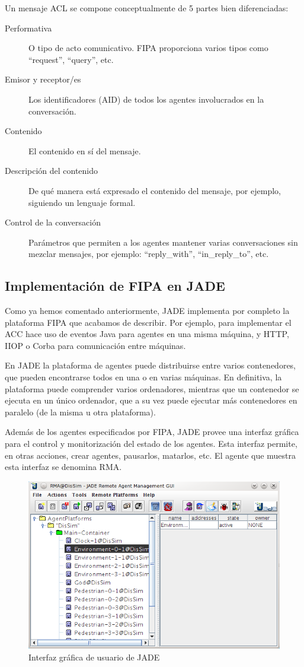 Un mensaje ACL se compone conceptualmente de 5 partes bien diferenciadas:

\begin{description}
 \item[Performativa] O tipo de acto comunicativo. FIPA proporciona varios tipos
 como ``request'', ``query'', etc.
 \item[Emisor y receptor/es] Los identificadores (AID) de todos los agentes
 involucrados en la conversación.
 \item[Contenido] El contenido en sí del mensaje.
 \item[Descripción del contenido] De qué manera está expresado el contenido del
 mensaje, por ejemplo, siguiendo un lenguaje formal.
 \item[Control de la conversación] Parámetros que permiten a los agentes
 mantener varias conversaciones sin mezclar mensajes, por ejemplo:
 ``reply\_with'', ``in\_reply\_to'', etc.
\end{description}

\subsection{Implementación de FIPA en JADE}

Como ya hemos comentado anteriormente, JADE implementa por completo la
plataforma FIPA que acabamos de describir. Por ejemplo, para implementar el ACC
hace uso de eventos Java para agentes en una misma máquina, y HTTP, IIOP o
Corba para comunicación entre máquinas.

En JADE la plataforma de agentes puede distribuirse entre varios contenedores,
que pueden encontrarse todos en una o en varias máquinas. En definitiva, la
plataforma puede comprender varios ordenadores, mientras que un contenedor se
ejecuta en un único ordenador, que a su vez puede ejecutar más contenedores en
paralelo (de la misma u otra plataforma).

Además de los agentes especificados por FIPA, JADE provee una interfaz gráfica
para el control y monitorización del estado de los agentes. Esta interfaz
permite, en otras acciones, crear agentes, pausarlos, matarlos, etc. El agente
que muestra esta interfaz se denomina RMA.

\begin{figure}[H]
 \centering
 \includegraphics[width=120mm]{figuras/cap4/rma.png}
 \caption{Interfaz gráfica de usuario de JADE}
\end{figure}

